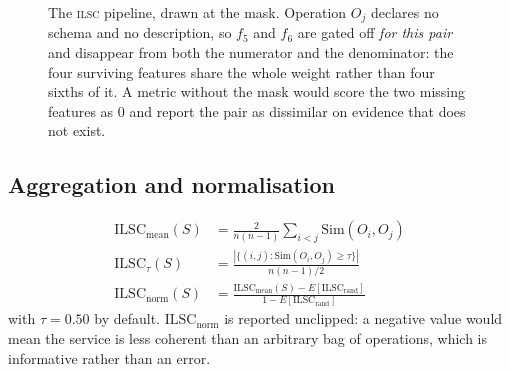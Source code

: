 \documentclass[journal]{IEEEtran}
\newcommand{\ilsc}{\textsc{ilsc}}
\newcommand{\ilscm}{\ensuremath{\mathrm{ILSC}_{\mathrm{mean}}}}
\newcommand{\ilsct}{\ensuremath{\mathrm{ILSC}_{\tau}}}
\newcommand{\ilscn}{\ensuremath{\mathrm{ILSC}_{\mathrm{norm}}}}
\begin{document}
\begin{figure}[!t]
\caption{The \ilsc{} pipeline, drawn at the mask. Operation $O_j$ declares no
schema and no description, so $f_5$ and $f_6$ are gated off \emph{for this pair}
and disappear from both the numerator and the denominator: the four surviving
features share the whole weight rather than four sixths of it. A metric without
the mask would score the two missing features as $0$ and report the pair as
dissimilar on evidence that does not exist.}
\label{fig:arch}
\end{figure}

\subsection{Aggregation and normalisation}
\begin{align}
\ilscm(S) &= \frac{2}{n(n-1)} \sum_{i<j} \mathrm{Sim}(O_i,O_j) \label{eq:mean}\\
\ilsct(S) &= \frac{|\{(i,j) : \mathrm{Sim}(O_i,O_j) \ge \tau\}|}{n(n-1)/2}
              \label{eq:tau}\\
\ilscn(S) &= \frac{\ilscm(S) - E[\mathrm{ILSC_{rand}}]}
                  {1 - E[\mathrm{ILSC_{rand}}]} \label{eq:norm}
\end{align}
with $\tau=0.50$ by default. $\ilscn$ is reported unclipped: a negative value
would mean the service is less coherent than an arbitrary bag of operations,
which is informative rather than an error.
\end{document}

